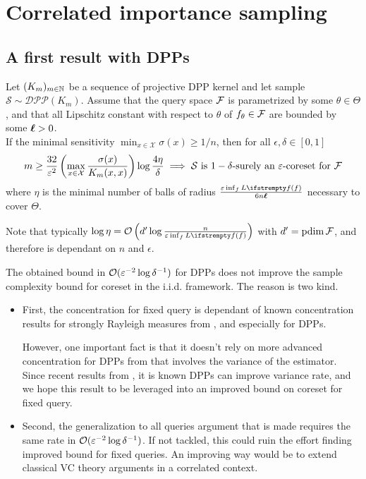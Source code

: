 \chapter{Correlated importance sampling}
\section{A first result with DPPs}

\cite{tremblay2018dppcoreset}

\begin{tcolorbox}
	\begin{theorem}
		Let $(K_m)_{m\in \mathbb{N}}$ be a sequence of projective DPP kernel and let sample $\mathcal{S} \sim \mathcal{DPP}(K_m)$. Assume that the query space $\mathcal{F}$ is parametrized by some $\theta \in \Theta$, and that all Lipschitz constant with respect to $\theta$ of $f_\theta \in \mathcal{F}$ are bounded by some $\boldsymbol\ell>0$.\\

		If the minimal sensitivity $\min_{x\in \mathcal{X}}\sigma(x) \geq 1/n$, then for all $\epsilon, \delta \in [0,1]$ 
		\begin{equation*}
            m \geq \frac{32}{\varepsilon^{2}}\left(\max_{x\in \mathcal{X}}\frac{\sigma(x)}{K_m(x,x)}\right) \log \frac{4\eta}{\delta}
			\implies 
			\text{$\mathcal{S}$ is $1-\delta$-surely an $\varepsilon$-coreset for $\mathcal{F}$}
		\end{equation*}
		where $\eta$ is the minimal number of balls of radius $\frac{\epsilon \inf_{f}\loss{f}}{6 n \lipschitz}$ necessary to cover $\Theta$.
	\end{theorem}
\end{tcolorbox}
Note that typically $\log \eta = \OO\left(\pdim \log \frac{n}{\epsilon \inf_{f}\loss{f}}\right)$ with ${d'} = \operatorname{pdim}\mathcal{F}$, and therefore is dependant on $n$ and $\epsilon$.


The obtained bound in $\mathcal{O}(\varepsilon^{-2}\log \delta^{-1})$ for DPPs does not improve the sample complexity bound for coreset in the i.i.d. framework. The reason is two kind. 

\begin{itemize}
	\item First, the concentration for fixed query is dependant of known concentration results for strongly Rayleigh measures from \cite{pemantle2011rayleighconcentration}, and especially for DPPs. 

	However, one important fact is that it doesn't rely on more advanced concentration for DPPs from \cite{breuer2013nevai} that involves the variance of the estimator. Since recent results from \cite{bardenet2020mcdpp}, it is known DPPs can improve variance rate, and we hope this result to be leveraged into an improved bound on coreset for fixed query.
	\item Second, the generalization to all queries argument that is made requires the same rate in $\mathcal{O}(\varepsilon^{-2}\log \delta^{-1})$. If not tackled, this could ruin the effort finding improved bound for fixed queries. An improving way would be to extend classical VC theory arguments in a correlated context.
\end{itemize}





